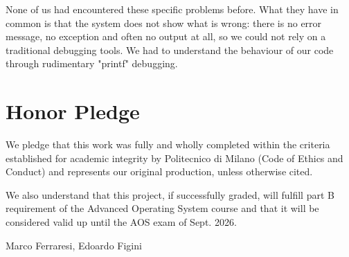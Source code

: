 \documentclass[10pt,a4]{article}
\begin{document}
None of us had encountered these specific problems before. What they have in
common is that the system does not show what is wrong: there is no error
message, no exception and often no output at all, so we could not rely
on a traditional debugging tools. We had to understand the behaviour of our code 
through rudimentary "printf" debugging. 

\section{Honor Pledge}

We pledge that this work was fully and wholly completed within the criteria
established for academic integrity by Politecnico di Milano (Code of Ethics and
Conduct) and represents our original production, unless otherwise cited.

We also understand that this project, if successfully graded,  will fulfill part B requirement of the
Advanced Operating System course and that it will be considered valid up until
the AOS exam of Sept. 2026.

\begin{flushright}
Marco Ferraresi, Edoardo Figini
\end{flushright}
\end{document}
